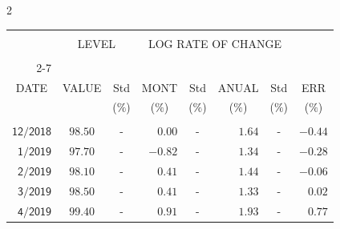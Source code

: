 \begin{multicols}{2}{ 
\begin{tabular}{rccrcrcr} 
\hline 
 \multicolumn{1}{|c|}{}  &  \multicolumn{2}{c|}{} & 
\multicolumn{4}{c}{} & \multicolumn{1}{|c|}{}\vspace{-.10in}\\ 
\multicolumn{1}{|c|}{}  &  \multicolumn{2}{c|}{LEVEL} & 
\multicolumn{4}{c}{LOG RATE OF CHANGE} & \multicolumn{1}{|c|}{}    \\  
\multicolumn{1}{|c|}{}  &  \multicolumn{2}{c|}{} & 
\multicolumn{4}{c}{} & \multicolumn{1}{|c|}{}\vspace{-.10in}\\ \cline{2-7} 
\multicolumn{1}{|c|}{ } &\multicolumn{1}{c|}{ } & \multicolumn{1}{c|}{} & \multicolumn{1}{c|}{} & \multicolumn{1}{c|}{}     & \multicolumn{1}{c|}{} & \multicolumn{1}{c|}{}  & \multicolumn{1}{c|}{}  \vspace{-.05in}\\  
\multicolumn{1}{|c|}{DATE } &\multicolumn{1}{c|}{ VALUE} & \multicolumn{1}{c|}{Std} & \multicolumn{1}{c|}{MONT} & \multicolumn{1}{c|}{Std}     & \multicolumn{1}{c|}{ANUAL} & \multicolumn{1}{c|}{Std}  & \multicolumn{1}{c|}{ERR}\\  
\multicolumn{1}{|c|}{ }      & \multicolumn{1}{c|}{  }    & \multicolumn{1}{c|}{($\%$)}&  \multicolumn{1}{c|}{($\%$)  }  & \multicolumn{1}{c|}{($\%$)} & \multicolumn{1}{c|}{($\%$) }     & \multicolumn{1}{c|}{ ($\%$) }  &  \multicolumn{1}{c|}{ ($\%$) } \\  
 \hline 
 \\$\mathsf{      12/2018}$ &$\mathsf{    98.50}$ &     - &$\mathsf{    0.00}$ &     - &$\mathsf{     1.64 }$ &     - &$\mathsf{  -0.44} $ \vspace{-.005in}\\ 
$\mathsf{       1/2019}$ &$\mathsf{    97.70}$ &     - &$\mathsf{   -0.82}$ &     - &$\mathsf{     1.34 }$ &     - &$\mathsf{  -0.28} $ \vspace{-.005in}\\ 
$\mathsf{       2/2019}$ &$\mathsf{    98.10}$ &     - &$\mathsf{    0.41}$ &     - &$\mathsf{     1.44 }$ &     - &$\mathsf{  -0.06} $ \vspace{-.005in}\\ 
$\mathsf{       3/2019}$ &$\mathsf{    98.50}$ &     - &$\mathsf{    0.41}$ &     - &$\mathsf{     1.33 }$ &     - &$\mathsf{   0.02} $ \vspace{-.005in}\\ 
$\mathsf{       4/2019}$ &$\mathsf{    99.40}$ &     - &$\mathsf{    0.91}$ &     - &$\mathsf{     1.93 }$ &     - &$\mathsf{   0.77} $ \vspace{-.005in}\\ 

\end{tabular}}
\end{multicols}
